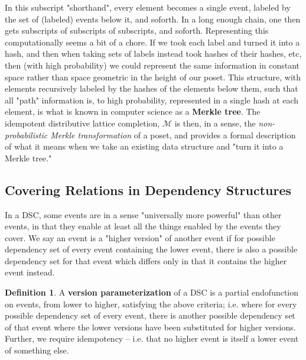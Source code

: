 \documentclass[hoptionsi,review,format=sigplan]{acmart}
\theoremstyle{definition}
\newtheorem{definition}{Definition}[section]
\newcommand{\Mcc}{\mathcal{M}}
\begin{document}
In this subscript "shorthand", every element becomes a single event, labeled by the set of (labeled) events below it, and soforth. In a long enough chain, one then gets subscripts of subscripts of subscripts, and soforth. Representing this computationally seems a bit of a chore. If we took each label and turned it into a hash, and then when taking sets of labels instead took hashes of their hashes, etc, then (with high probability) we could represent the same information in constant space rather than space geometric in the height of our poset. This structure, with elements recursively labeled by the hashes of the elements below them, such that all "path" information is, to high probability, represented in a single hash at each element, is what is known in computer science as a \textbf{Merkle tree}. The idempotent distributive lattice completion, \(\Mcc\) is then, in a sense, the \textit{non-probabilistic Merkle transformation} of a poset, and provides a formal description of what it means when we take an existing data structure and "turn it into a Merkle tree."




\subsection{Covering Relations in Dependency Structures}

In a DSC, some events are in a sense "universally more powerful" than other events, in that they enable at least all the things enabled by the events they cover. We say an event is a "higher version" of another event if for possible dependency set of every event containing the lower event, there is also a possible dependency set for that event which differs only in that it contains the higher event instead.

\begin{definition}
A \textbf{version parameterization} of a DSC is a partial endofunction on events, from lower to higher, satisfying the above criteria; i.e. where for every possible dependency set of every event, there is another possible dependency set of that event where the lower versions have been substituted for higher versions. Further, we require idempotency -- i.e. that no higher event is itself a lower event of something else.
\end{definition}
\end{document}

